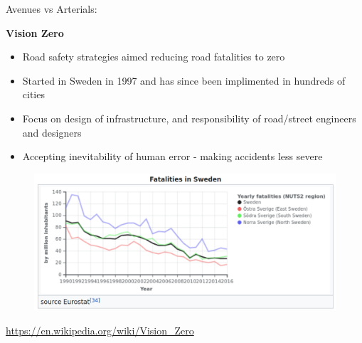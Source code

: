 \documentclass[aspectratio=169]{beamer}
\begin{document}
\begin{frame}
	
	Avenues vs Arterials:
	
	
\end{frame}




\begin{frame}
	
	\textbf{Vision Zero}
	
	\vspace{2mm}
	
	\begin{itemize}
		\item Road safety strategies aimed reducing road fatalities to zero
		\item Started in Sweden in 1997 and has since been implimented in hundreds of cities
		\item Focus on design of infrastructure, and responsibility of road/street engineers and designers
		\item Accepting inevitability of human error - making accidents less severe
	\end{itemize}

	\begin{figure}
		\centering
		\includegraphics[width=0.75\linewidth]{images/sweden_road_fatalities.png}
		
	\end{figure}
	\tiny{\url{https://en.wikipedia.org/wiki/Vision_Zero}}


	
\end{frame}
\end{document}
